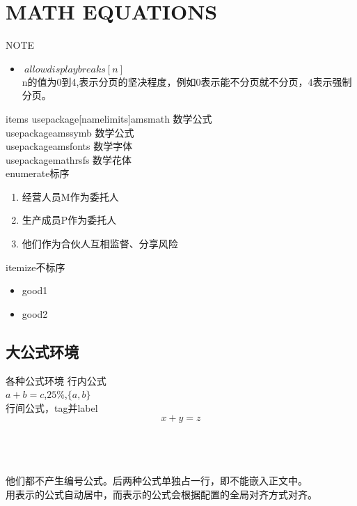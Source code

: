 \section{MATH EQUATIONS}
\begin{frame}{NOTE}
\begin{itemize}
	\item $\ allowdisplaybreaks[n]$\\
	n的值为0到4,表示分页的坚决程度，例如0表示能不分页就不分页，4表示强制分页。\\
\end{itemize}

\end{frame}

\begin{frame}{items}
	usepackage[namelimits]{amsmath} 数学公式\\
	usepackage{amssymb}             数学公式\\
	usepackage{amsfonts}            数学字体\\
	usepackage{mathrsfs}            数学花体\\
	enumerate标序
	\begin{enumerate}
	\item 经营人员M作为委托人
	\item 生产成员P作为委托人
	\item 他们作为合伙人互相监督、分享风险
	\end{enumerate}
	itemize不标序
	\begin{itemize}
	\item good1
	\item good2
	\end{itemize}
\end{frame}	

\subsection{大公式环境}
\begin{frame}{各种公式环境}
	行内公式\\
	$ a+b=c $,$ 25\% $,$ \{a,b\} $\\

	\vspace{1em}
	行间公式，tag并label
	\[x+y=z \tag{1.1}\label{1.1}\]

	\\
	\\
	\text{/$[ equation /$]}\\
	他们都不产生编号公式。后两种公式单独占一行，即不能嵌入正文中。\\
	用\text{\$\$}表示的公式自动居中，而\text{/$[ /$ ]}表示的公式会根据配置的全局对齐方式对齐。
\end{frame}


